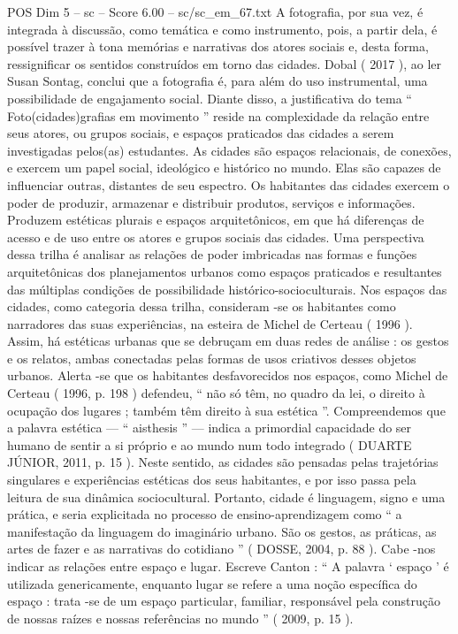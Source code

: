 \begin{textsample}{POS Dim 5 – sc – Score 6.00 – sc/sc\_em\_67.txt}
A fotografia, por sua vez, é integrada à discussão, como temática e como instrumento, pois, a partir dela, é possível trazer à tona memórias e narrativas dos atores sociais e, desta forma, ressignificar os sentidos construídos em torno das cidades.
Dobal ( 2017 ), ao ler Susan Sontag, conclui que a fotografia é, para além do uso instrumental, uma possibilidade de engajamento social.
Diante disso, a justificativa do tema “ Foto(cidades)grafias em movimento ” reside na complexidade da relação entre seus atores, ou grupos sociais, e espaços praticados das cidades a serem investigadas pelos(as) estudantes.
As cidades são espaços relacionais, de conexões, e exercem um papel social, ideológico e histórico no mundo.
Elas são capazes de influenciar outras, distantes de seu espectro.
Os habitantes das cidades exercem o poder de produzir, armazenar e distribuir produtos, serviços e informações.
Produzem estéticas plurais e espaços arquitetônicos, em que há diferenças de acesso e de uso entre os atores e grupos sociais das cidades.
Uma perspectiva dessa trilha é analisar as relações de poder imbricadas nas formas e funções arquitetônicas dos planejamentos urbanos como espaços praticados e resultantes das múltiplas condições de possibilidade histórico-socioculturais.
Nos espaços das cidades, como categoria dessa trilha, consideram -se os habitantes como narradores das suas experiências, na esteira de Michel de Certeau ( 1996 ).
Assim, há estéticas urbanas que se debruçam em duas redes de análise : os gestos e os relatos, ambas conectadas pelas formas de usos criativos desses objetos urbanos.
Alerta -se que os habitantes desfavorecidos nos espaços, como Michel de Certeau ( 1996, p. 198 ) defendeu, “ não só têm, no quadro da lei, o direito à ocupação dos lugares ; também têm direito à sua estética ”.
Compreendemos que a palavra estética — “ aisthesis ” — indica a primordial capacidade do ser humano de sentir a si próprio e ao mundo num todo integrado ( DUARTE JÚNIOR, 2011, p. 15 ).
Neste sentido, as cidades são pensadas pelas trajetórias singulares e experiências estéticas dos seus habitantes, e por isso passa pela leitura de sua dinâmica sociocultural.
Portanto, cidade é linguagem, signo e uma prática, e seria explicitada no processo de ensino-aprendizagem como “ a manifestação da linguagem do imaginário urbano.
São os gestos, as práticas, as artes de fazer e as narrativas do cotidiano ” ( DOSSE, 2004, p. 88 ).
Cabe -nos indicar as relações entre espaço e lugar.
Escreve Canton : “ A palavra ‘ espaço ’ é utilizada genericamente, enquanto lugar se refere a uma noção específica do espaço : trata -se de um espaço particular, familiar, responsável pela construção de nossas raízes e nossas referências no mundo ” ( 2009, p. 15 ).

\end{textsample}
